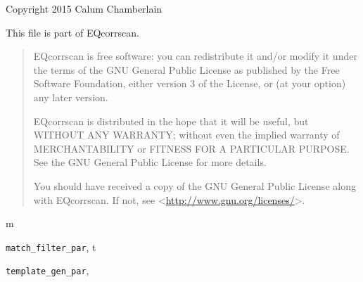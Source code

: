\documentclass[a4paper,10pt,english]{sphinxmanual}
\begin{document}
Copyright 2015 Calum Chamberlain

This file is part of EQcorrscan.
\begin{quote}

EQcorrscan is free software: you can redistribute it and/or modify
it under the terms of the GNU General Public License as published by
the Free Software Foundation, either version 3 of the License, or
(at your option) any later version.

EQcorrscan is distributed in the hope that it will be useful,
but WITHOUT ANY WARRANTY; without even the implied warranty of
MERCHANTABILITY or FITNESS FOR A PARTICULAR PURPOSE.  See the
GNU General Public License for more details.

You should have received a copy of the GNU General Public License
along with EQcorrscan.  If not, see \textless{}\href{http://www.gnu.org/licenses/}{http://www.gnu.org/licenses/}\textgreater{}.
\end{quote}


\renewcommand{\indexname}{Python Module Index}
\begin{theindex}
\def\bigletter#1{{\Large\sffamily#1}\nopagebreak\vspace{1mm}}
\bigletter{m}
\item {\texttt{match\_filter\_par}}, \pageref{par:module-match_filter_par}
\indexspace
\bigletter{t}
\item {\texttt{template\_gen\_par}}, \pageref{par:module-template_gen_par}
\end{theindex}

\renewcommand{\indexname}{Index}
\printindex
\end{document}
